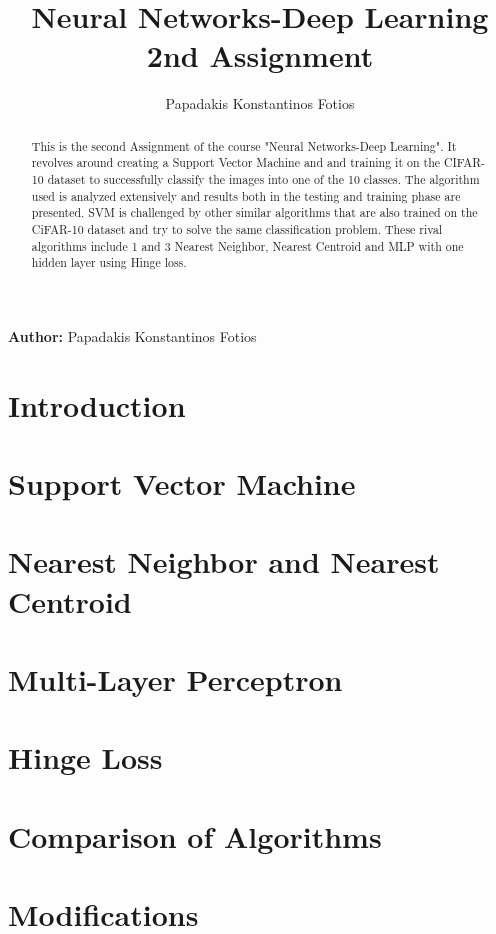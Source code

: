 \documentclass[lettersize,journal]{IEEEtran}
\begin{document}
\title{Neural Networks-Deep Learning \\ 2nd Assignment}
\author{Papadakis Konstantinos Fotios}
\maketitle

\textbf{Author:} Papadakis Konstantinos Fotios \\

\smallskip

\begin{abstract}
This is the second Assignment of the course "Neural Networks-Deep Learning". It revolves around
creating a Support Vector Machine and and training it on the CIFAR-10 dataset to successfully 
classify the images into one of the 10 classes. The algorithm used is analyzed extensively and
results both in the testing and training phase are presented. SVM is challenged by other similar
algorithms that are also trained on the CiFAR-10 dataset and try to solve the same classification 
problem. These rival algorithms include 1 and 3 Nearest Neighbor, Nearest Centroid and MLP with
one hidden layer using Hinge loss.
\end{abstract}

\section{Introduction}
 

\section{Support Vector Machine}


\section{Nearest Neighbor and Nearest Centroid}


\section{Multi-Layer Perceptron}


\section{Hinge Loss}


\section{Comparison of Algorithms}


\section{Modifications}


\vfill
\end{document}

